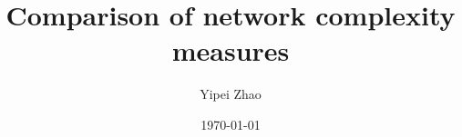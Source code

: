 \documentclass{beamer}
\title{Comparison of network complexity measures}
\author{Yipei Zhao}
\institute{Aston University}
\date{\today}
\begin{document}
    \frame{\titlepage}
\end{document}
